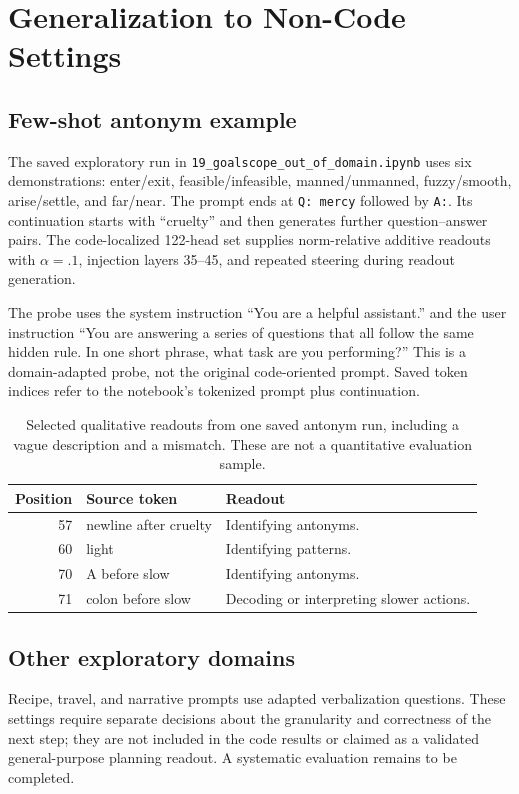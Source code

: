 \section{Generalization to Non-Code Settings}
\label{app:non-code}
\subsection{Few-shot antonym example}
The saved exploratory run in \texttt{19\_goalscope\_out\_of\_domain.ipynb} uses six demonstrations: enter/exit, feasible/infeasible, manned/unmanned, fuzzy/smooth, arise/settle, and far/near. The prompt ends at \texttt{Q: mercy} followed by \texttt{A:}. Its continuation starts with ``cruelty'' and then generates further question--answer pairs. The code-localized 122-head set supplies norm-relative additive readouts with $\alpha=.1$, injection layers 35--45, and repeated steering during readout generation.

The probe uses the system instruction ``You are a helpful assistant.'' and the user instruction ``You are answering a series of questions that all follow the same hidden rule. In one short phrase, what task are you performing?'' This is a domain-adapted probe, not the original code-oriented prompt. Saved token indices refer to the notebook's tokenized prompt plus continuation.

\begin{table}[h]\centering\small
\begin{tabular}{rll}\toprule
Position & Source token & Readout\\\midrule
57 & newline after cruelty & Identifying antonyms.\\
60 & light & Identifying patterns.\\
70 & A before slow & Identifying antonyms.\\
71 & colon before slow & Decoding or interpreting slower actions.\\
\bottomrule\end{tabular}
\caption{Selected qualitative readouts from one saved antonym run, including a vague description and a mismatch. These are not a quantitative evaluation sample.}
\end{table}

\subsection{Other exploratory domains}
Recipe, travel, and narrative prompts use adapted verbalization questions. These settings require separate decisions about the granularity and correctness of the next step; they are not included in the code results or claimed as a validated general-purpose planning readout. A systematic evaluation remains to be completed.

